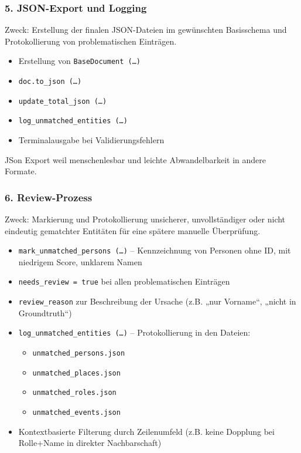 \documentclass[12pt, a4paper, ngerman, bidi=default]{article}
\begin{document}
\subsubsection*{5. JSON-Export und Logging}
Zweck: Erstellung der finalen JSON-Dateien im gewünschten Basisschema und Protokollierung von problematischen Einträgen.
\begin{itemize}
\item Erstellung von \texttt{BaseDocument~(\dots)}
\item \texttt{doc.to\_json~(\dots)}
\item \texttt{update\_total\_json~(\dots)}
\item \texttt{log\_unmatched\_entities~(\dots)}
\item Terminalausgabe bei Validierungsfehlern
\end{itemize}

JSon Export weil menschenlesbar und leichte Abwandelbarkeit in andere Formate.

\subsubsection*{6. Review-Prozess}
Zweck: Markierung und Protokollierung unsicherer, unvollständiger oder nicht eindeutig gematchter Entitäten für eine spätere manuelle Überprüfung.

\begin{itemize}
\item \texttt{mark\_unmatched\_persons~(\dots)} – Kennzeichnung von Personen ohne ID, mit niedrigem Score, unklarem Namen
\item \texttt{needs\_review = true} bei allen problematischen Einträgen
\item \texttt{review\_reason} zur Beschreibung der Ursache (z.B. „nur Vorname“, „nicht in Groundtruth“)
\item \texttt{log\_unmatched\_entities~(\dots)} – Protokollierung in den Dateien:
  \begin{itemize}
  \item \texttt{unmatched\_persons.json}
  \item \texttt{unmatched\_places.json}
  \item \texttt{unmatched\_roles.json}
  \item \texttt{unmatched\_events.json}
  \end{itemize}
\item Kontextbasierte Filterung durch Zeilenumfeld (z.B. keine Dopplung bei Rolle+Name in direkter Nachbarschaft)
\end{itemize}
\end{document}
